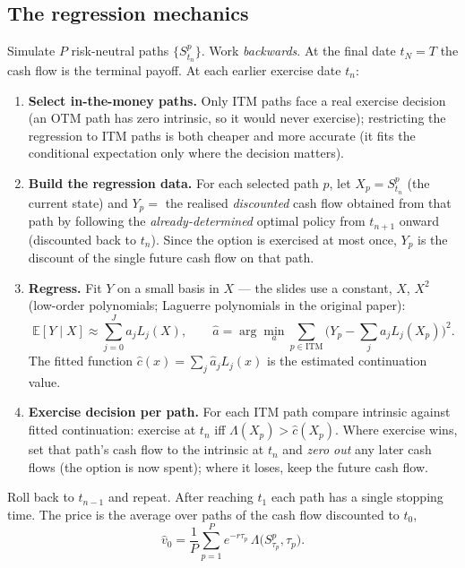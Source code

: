 \documentclass[11pt]{article}
\newcommand{\E}{\mathbb{E}}
\begin{document}
\subsection{The regression mechanics}
Simulate $P$ risk-neutral paths $\{S^p_{t_n}\}$. Work \emph{backwards}. At the final date $t_N=T$ the cash
flow is the terminal payoff. At each earlier exercise date $t_n$:
\begin{enumerate}[leftmargin=*]
  \item \textbf{Select in-the-money paths.} Only ITM paths face a real exercise decision (an OTM path has zero
  intrinsic, so it would never exercise); restricting the regression to ITM paths is both cheaper and more
  accurate (it fits the conditional expectation only where the decision matters).
  \item \textbf{Build the regression data.} For each selected path $p$, let $X_p=S^p_{t_n}$ (the current
  state) and $Y_p=$ the realised \emph{discounted} cash flow obtained from that path by following the
  \emph{already-determined} optimal policy from $t_{n+1}$ onward (discounted back to $t_n$). Since the option
  is exercised at most once, $Y_p$ is the discount of the single future cash flow on that path.
  \item \textbf{Regress.} Fit $Y$ on a small basis in $X$ --- the slides use a constant, $X$, $X^2$ (low-order
  polynomials; Laguerre polynomials in the original paper):
  \begin{equation}\label{eq:reg}
  \E[Y\mid X]\approx \sum_{j=0}^{J} a_j L_j(X),\qquad
  \hat a=\arg\min_a\sum_{p\in\text{ITM}}\Big(Y_p-\sum_j a_j L_j(X_p)\Big)^2 .
  \end{equation}
  The fitted function $\hat c(x)=\sum_j\hat a_j L_j(x)$ is the estimated continuation value.
  \item \textbf{Exercise decision per path.} For each ITM path compare intrinsic against fitted continuation:
  exercise at $t_n$ iff $\Lambda(X_p)>\hat c(X_p)$. Where exercise wins, set that path's cash flow to the
  intrinsic at $t_n$ and \emph{zero out} any later cash flows (the option is now spent); where it loses, keep
  the future cash flow.
\end{enumerate}
Roll back to $t_{n-1}$ and repeat. After reaching $t_1$ each path has a single stopping time. The price is the
average over paths of the cash flow discounted to $t_0$,
\begin{equation}\label{eq:lsmprice}
\hat v_0=\frac1P\sum_{p=1}^{P} e^{-r\tau_p}\,\Lambda\!\big(S^p_{\tau_p},\tau_p\big).
\end{equation}
\end{document}
